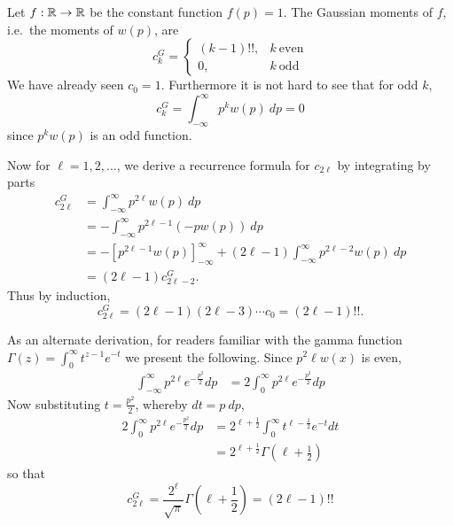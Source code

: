 \begin{myexample}
  Let $f: \mathbb{R} \rightarrow \mathbb{R}$ be the constant function $f(p)=1$. The Gaussian moments of $f$, i.e.\ the moments of $w(p)$, are
  \[
    c^G_k 
    = \begin{cases}
        (k-1)!!, & k~\text{even} \\
        0, & k~\text{odd}
    \end{cases}
  \]
  We have already seen $c_0 = 1$. Furthermore it is not hard to see that for odd $k$, 
  \[
    c^G_k = \int_{-\infty}^\infty p^k w(p) ~dp = 0
  \]
  since $p^k w(p)$ is an odd function.

  Now for $\ell = 1, 2, \ldots$, we derive a recurrence formula for $c_{2\ell}$ by integrating by parts
  \begin{align*}
    c^G_{2\ell}
    &= \int_{-\infty}^\infty p^{2\ell} w(p) ~dp \\
    &= -\int_{-\infty}^\infty p^{2\ell-1} \left(-p w(p)\right) ~dp \\
    &= - \left[p^{2\ell-1} w(p)\right]_{-\infty}^\infty + (2\ell-1)\int_{-\infty}^\infty p^{2\ell-2} w(p) ~dp \\
    &= (2\ell-1)c^G_{2\ell-2}.
  \end{align*}
  Thus by induction,
  \[
    c^G_{2\ell} = (2\ell - 1)(2\ell - 3) \cdots c_0 = (2\ell-1)!!.
  \]

  As an alternate derivation, for readers familiar with the gamma function $\Gamma(z) = \int_0^\infty t^{z-1}e^{-t}$ we present the following. Since $p^2\ell w(x)$ is even,
  \begin{align*}
    \int_{-\infty}^\infty p^{2\ell} e^{-\frac{p^2}2} dp 
      &= 2\int_0^\infty p^{2\ell} e^{-\frac{p^2}2} dp 
  \end{align*}
  Now substituting $t = \frac{p^2}2$, whereby $dt = p~dp$,
  \begin{align*}
    2\int_0^\infty p^{2\ell} e^{-\frac{p^2}2} dp 
      &= 2^{\ell+\frac12}\int_0^\infty t^{\ell - \frac12}e^{-t} dt \\
      &= 2^{\ell+\frac12} \Gamma\left(\ell + \frac12\right)
  \end{align*}
  so that
  \[
    c^G_{2\ell} = \frac{2^{\ell}}{\sqrt{\pi}} \Gamma\left(\ell + \frac12\right) = (2\ell - 1)!!
  \]
\end{myexample}




